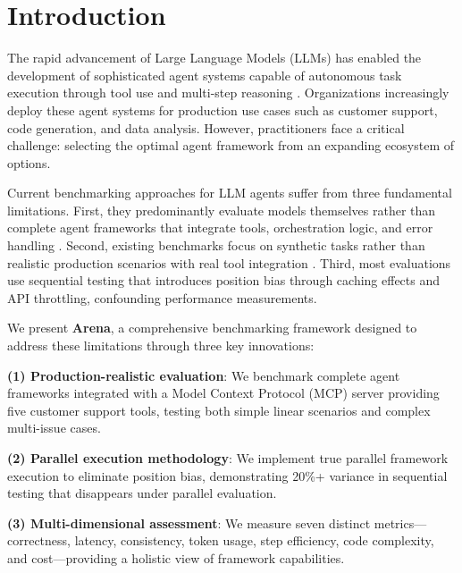 \documentclass[sigconf,nonacm]{acmart}
\begin{document}
\maketitle

\section{Introduction}

The rapid advancement of Large Language Models (LLMs) has enabled the development of sophisticated agent systems capable of autonomous task execution through tool use and multi-step reasoning \cite{schick2024toolformer,qin2023tool}. Organizations increasingly deploy these agent systems for production use cases such as customer support, code generation, and data analysis. However, practitioners face a critical challenge: selecting the optimal agent framework from an expanding ecosystem of options.

Current benchmarking approaches for LLM agents suffer from three fundamental limitations. First, they predominantly evaluate models themselves rather than complete agent frameworks that integrate tools, orchestration logic, and error handling \cite{liu2023agentbench}. Second, existing benchmarks focus on synthetic tasks rather than realistic production scenarios with real tool integration \cite{xu2023wizardlm}. Third, most evaluations use sequential testing that introduces position bias through caching effects and API throttling, confounding performance measurements.

We present \textbf{Arena}, a comprehensive benchmarking framework designed to address these limitations through three key innovations:

\textbf{(1) Production-realistic evaluation}: We benchmark complete agent frameworks integrated with a Model Context Protocol (MCP) server providing five customer support tools, testing both simple linear scenarios and complex multi-issue cases.

\textbf{(2) Parallel execution methodology}: We implement true parallel framework execution to eliminate position bias, demonstrating 20\%+ variance in sequential testing that disappears under parallel evaluation.

\textbf{(3) Multi-dimensional assessment}: We measure seven distinct metrics—correctness, latency, consistency, token usage, step efficiency, code complexity, and cost—providing a holistic view of framework capabilities.
\end{document}
